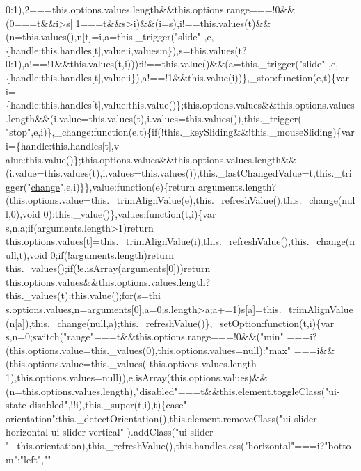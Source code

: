 \begin{DoxyCode}
{{      0:1),2===this.options.values.length&&this.options.range===!0&&(0===t&&i>s||1===t&&s>i)&&(i=s),i!==this.values(t)&&(n=this.values(),n[t]=i,a=this.\_trigger("}slide\textcolor{stringliteral}{"
      ,e,\{handle:this.handles[t],value:i,values:n\}),s=this.values(t?0:1),a!==!1&&this.values(t,i))):i!==this.value()&&(a=this.\_trigger("}slide\textcolor{stringliteral}{"
      ,e,\{handle:this.handles[t],value:i\}),a!==!1&&this.value(i))\},\_stop:function(e,t)\{var
       i=\{handle:this.handles[t],value:this.value()\};this.options.values&&this.options.values.length&&(i.value=this.values(t),i.values=this.values()),this.\_trigger(
      "}stop\textcolor{stringliteral}{",e,i)\},\_change:function(e,t)\{if(!this.\_keySliding&&!this.\_mouseSliding)\{var
       i=\{handle:this.handles[t],v
      alue:this.value()\};this.options.values&&this.options.values.length&&(i.value=this.values(t),i.values=this.values()),this.\_lastChangedValue=t,this.\_trigger("}\hyperlink{period_type_select_8js_a13fd7c7324633c2bbcf51e83a3538bd4}{change}\textcolor{stringliteral}{",e,i)\}\},value:function(e)\{return
       arguments.length?(this.options.value=this.\_trimAlignValue(e),this.\_refreshValue(),this.\_change(null,0),void
       0):this.\_value()\},values:function(t,i)\{var s,n,a;if(arguments.length>1)return
       this.options.values[t]=this.\_trimAlignValue(i),this.\_refreshValue(),this.\_change(null,t),void 0;if(!arguments.length)return
       this.\_values();if(!e.isArray(arguments[0]))return
       this.options.values&&this.options.values.length?this.\_values(t):this.value();for(s=thi
      s.options.values,n=arguments[0],a=0;s.length>a;a+=1)s[a]=this.\_trimAlignValue(n[a]),this.\_change(null,a);this.\_refreshValue()\},\_setOption:function(t,i)\{var s,n=0;switch("}range\textcolor{stringliteral}{"===t&&this.options.range===!0&&("}min\textcolor{stringliteral}{"
      ===i?(this.options.value=this.\_values(0),this.options.values=null):"}max\textcolor{stringliteral}{"
      ===i&&(this.options.value=this.\_values(
      this.options.values.length-1),this.options.values=null)),e.isArray(this.options.values)&&(n=this.options.values.length),"}disabled\textcolor{stringliteral}{"===t&&this.element.toggleClass("}ui-state-disabled\textcolor{stringliteral}{",!!i),this.\_super(t,i),t)\{case"}
      orientation\textcolor{stringliteral}{":this.\_detectOrientation(),this.element.removeClass("}ui-slider-horizontal ui-slider-vertical\textcolor{stringliteral}{"
      ).addClass("}ui-slider-\textcolor{stringliteral}{"+this.orientation),this.\_refreshValue(),this.handles.css("}horizontal\textcolor{stringliteral}{"===i?"}bottom\textcolor{stringliteral}{":"}left\textcolor{stringliteral}{","}\textcolor{stringliteral}{"
}}
\end{DoxyCode}
